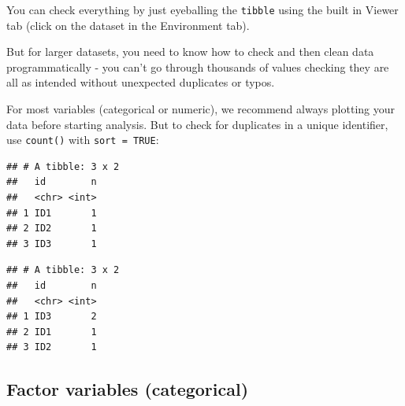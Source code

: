 \documentclass[
  12pt,
  krantz2]{krantz}
\makeatletter
\newenvironment{Shaded}{\begin{snugshade}}{\end{snugshade}}
\newcommand{\CommentTok}[1]{\textcolor[rgb]{0.56,0.35,0.01}{\textit{#1}}}
\newcommand{\DataTypeTok}[1]{\textcolor[rgb]{0.13,0.29,0.53}{#1}}
\newcommand{\KeywordTok}[1]{\textcolor[rgb]{0.13,0.29,0.53}{\textbf{#1}}}
\newcommand{\NormalTok}[1]{#1}
\newcommand{\OperatorTok}[1]{\textcolor[rgb]{0.81,0.36,0.00}{\textbf{#1}}}
\newcommand{\OtherTok}[1]{\textcolor[rgb]{0.56,0.35,0.01}{#1}}
\newcommand{\StringTok}[1]{\textcolor[rgb]{0.31,0.60,0.02}{#1}}
\newenvironment{kframe}{%
\medskip{}
\setlength{\fboxsep}{.8em}
 \def\at@end@of@kframe{}%
 \ifinner\ifhmode%
  \def\at@end@of@kframe{\end{minipage}}%
  \begin{minipage}{\columnwidth}%
 \fi\fi%
 \def\FrameCommand##1{\hskip\@totalleftmargin \hskip-\fboxsep
 \colorbox{shadecolor}{##1}\hskip-\fboxsep
     \hskip-\linewidth \hskip-\@totalleftmargin \hskip\columnwidth}%
 \MakeFramed {\advance\hsize-\width
   \@totalleftmargin\z@ \linewidth\hsize
   \@setminipage}}%
 {\par\unskip\endMakeFramed%
 \at@end@of@kframe}
\renewenvironment{Shaded}{\begin{kframe}}{\end{kframe}}
\makeatother
\begin{document}
You can check everything by just eyeballing the \texttt{tibble} using the built in Viewer tab (click on the dataset in the Environment tab).

But for larger datasets, you need to know how to check and then clean data programmatically - you can't go through thousands of values checking they are all as intended without unexpected duplicates or typos.

For most variables (categorical or numeric), we recommend always plotting your data before starting analysis.
But to check for duplicates in a unique identifier, use \texttt{count()} with \texttt{sort\ =\ TRUE}:

\begin{Shaded}
\end{Shaded}

\begin{verbatim}
## # A tibble: 3 x 2
##   id        n
##   <chr> <int>
## 1 ID1       1
## 2 ID2       1
## 3 ID3       1
\end{verbatim}

\begin{Shaded}
\end{Shaded}

\begin{verbatim}
## # A tibble: 3 x 2
##   id        n
##   <chr> <int>
## 1 ID3       2
## 2 ID1       1
## 3 ID2       1
\end{verbatim}

\hypertarget{factor-variables-categorical}{%
\subsection{Factor variables (categorical)}\label{factor-variables-categorical}}
\end{document}
